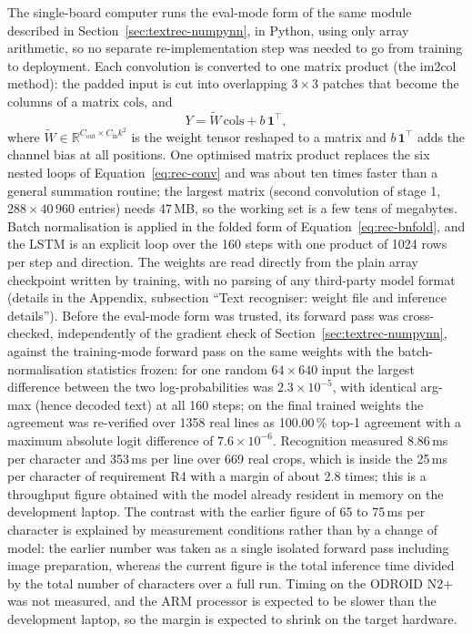 The single-board computer runs the eval-mode form of the same module described in Section~\ref{sec:textrec-numpynn}, in Python, using only array arithmetic, so no separate re-implementation step was needed to go from training to deployment.
Each convolution is converted to one matrix product (the im2col method): the padded input is cut into overlapping $3\times3$ patches that become the columns of a matrix $\mathrm{cols}$, and
\begin{equation}
Y=\tilde W\,\mathrm{cols}+b\,\mathbf 1^{\top},
\label{eq:rec-im2col}
\end{equation}
where $\tilde W\in\mathbb R^{C_{\mathrm{out}}\times C_{\mathrm{in}}k^2}$ is the weight tensor reshaped to a matrix and $b\,\mathbf 1^\top$ adds the channel bias at all positions.
One optimised matrix product replaces the six nested loops of Equation~\ref{eq:rec-conv} and was about ten times faster than a general summation routine; the largest matrix (second convolution of stage 1, $288\times40\,960$ entries) needs 47\,MB, so the working set is a few tens of megabytes.
Batch normalisation is applied in the folded form of Equation~\ref{eq:rec-bnfold}, and the LSTM is an explicit loop over the 160 steps with one product of 1024 rows per step and direction.
The weights are read directly from the plain array checkpoint written by training, with no parsing of any third-party model format (details in the Appendix, subsection ``Text recogniser: weight file and inference details'').
Before the eval-mode form was trusted, its forward pass was cross-checked, independently of the gradient check of Section~\ref{sec:textrec-numpynn}, against the training-mode forward pass on the same weights with the batch-normalisation statistics frozen: for one random $64\times640$ input the largest difference between the two log-probabilities was $2.3\times10^{-5}$, with identical arg-max (hence decoded text) at all 160 steps; on the final trained weights the agreement was re-verified over 1358 real lines as 100.00\,\% top-1 agreement with a maximum absolute logit difference of $7.6\times10^{-6}$.
Recognition measured 8.86\,ms per character and 353\,ms per line over 669 real crops, which is inside the 25\,ms per character of requirement R4 with a margin of about 2.8 times; this is a throughput figure obtained with the model already resident in memory on the development laptop.
The contrast with the earlier figure of 65 to 75\,ms per character is explained by measurement conditions rather than by a change of model: the earlier number was taken as a single isolated forward pass including image preparation, whereas the current figure is the total inference time divided by the total number of characters over a full run.
Timing on the ODROID N2+ was not measured, and the ARM processor is expected to be slower than the development laptop, so the margin is expected to shrink on the target hardware.

